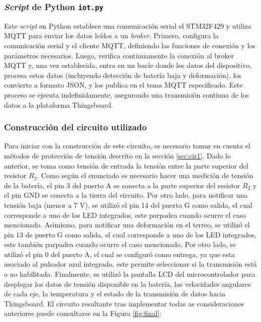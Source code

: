 \subsubsection{\textit{Script} de Python \texttt{iot.py}}
Este \textit{script} en Python establece una comunicación serial el STM32F429 y utiliza MQTT para enviar los datos leídos a un \textit{broker}. Primero, configura la comunicación serial y el cliente MQTT, definiendo las funciones de conexión y los parámetros necesarios. Luego, verifica continuamente la conexión al broker MQTT y, una vez establecida, entra en un bucle donde lee datos del dispositivo, procesa estos datos (incluyendo detección de batería baja y deformación), los convierte a formato JSON, y los publica en el tema MQTT especificado. Este proceso se ejecuta indefinidamente, asegurando una transmisión continua de los datos a la plataforma Thingsboard.

\subsubsection{Construcción del circuito utilizado}
Para iniciar con la construcción de este circuito, es necesario tomar en cuenta el métodos de protección de tensión descrito en la sección \ref{sec:cir1}. Dado lo anterior, se toma como tensión de entrada la tensión entre la parte superior del resistor $R_{2}$. Como según el enunciado es necesario hacer una medición de tensión de la batería, el pin 3 del puerto A se conecta a la parte superior del resistor $R_{2}$ y el pin GND se conecta a la tierra del circuito. Por otro lado, para notificar una tensión baja (menor a 7 V), se utilizó el pin 14 del puerto G como salida, el cual corresponde a uno de los LED integrados, este parpadea cuando ocurre el caso mencionado. Asimismo, para notificar una deformación en el terreo, se utilizó el pin 13 de puerto G como salida, el cual corresponde a uno de los LED integrados, este también parpadea cuando ocurre el caso mencionado. Por otro lado, se utilizó el pin 0 del puerto A, el cual se configuró como entrega, ya que esta asociado al pulsador azul integrado, este permite seleccionar si la transmisión está o no habilitada. Finalmente, se utilizó la pantalla LCD del microcontrolador para desplegar los datos de tensión disponible en la batería, las velocidades angulares de cada eje, la temperatura y el estado de la transmisión de datos hacia Thingsboard. El circuito resultante tras implementar todas as consideraciones anteriores puede consultarse en la Figura \ref{fig:final}:


